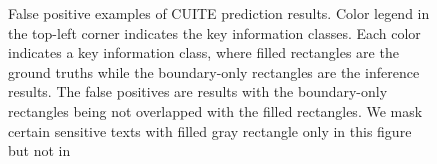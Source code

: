 \documentclass[10pt,twocolumn,letterpaper]{article}
\begin{document}
\begin{figure}
\begin{center}
\end{center}
   \caption{False positive examples of CUITE prediction results. Color legend in the top-left corner indicates the key information classes. Each color indicates a key information class, where filled rectangles are the ground truths while the boundary-only rectangles are the inference results. The false positives are results with the boundary-only rectangles being not overlapped with the filled rectangles. We mask certain sensitive texts with filled gray rectangle only in this figure but not in }
\label{fig:falsepositive}
\end{figure}
\end{document}
